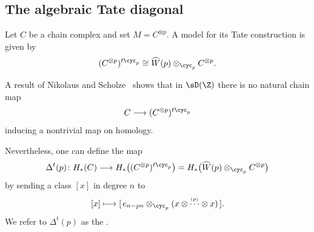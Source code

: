 %
%
%	
\subsection{The algebraic Tate diagonal}

Let $C$ be a chain complex and set $M = C^{\otimes p}$. A model for its Tate construction is given by
\[
(C^{\otimes p})^{t\cyc_p} \cong \widehat W(p)\otimes_{\cyc_p} C^{\otimes p}.
\]

A result of Nikolaus and Scholze~\cite{??} shows that in $\sD(\Z)$ there is no natural chain map
\[
C \longrightarrow (C^{\otimes p})^{t\cyc_p}
\]
inducing a nontrivial map on homology.

Nevertheless, one can define the map
\[
\Delta^t(p)\colon H_*(C)\longrightarrow H_*\big((C^{\otimes p})^{t\cyc_p}\big)
= H_*\big(\widehat W(p)\otimes_{\cyc_p} C^{\otimes p}\big)
\]
by sending a class $[x]$ in degree $n$ to
\[
[x] \longmapsto [\,e_{n-pn}\otimes_{\cyc_p} (x\otimes \overset{_{(p)}}{\cdots} \otimes x)\,].
\]
We refer to $\Delta^t(p)$ as the .

